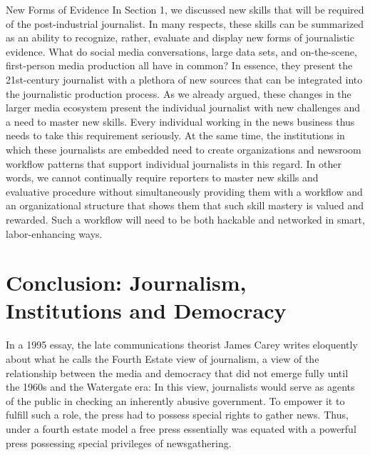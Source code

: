 New Forms of Evidence
In Section 1, we discussed new skills that will be required of the post-industrial
journalist. In many respects, these skills can be summarized as an ability to recognize,
rather, evaluate and display new forms of journalistic evidence. What do
social media conversations, large data sets, and on-the-scene, first-person media
production all have in common? In essence, they present the 21st-century journalist
with a plethora of new sources that can be integrated into the journalistic
production process.
As we already argued, these changes in the larger media ecosystem present the
individual journalist with new challenges and a need to master new skills. Every
individual working in the news business thus needs to take this requirement
seriously. At the same time, the institutions in which these journalists are embedded
need to create organizations and newsroom workflow patterns that support
individual journalists in this regard.
In other words, we cannot continually require reporters to master new skills and
evaluative procedure without simultaneously providing them with a workflow
and an organizational structure that shows them that such skill mastery is valued
and rewarded. Such a workflow will need to be both hackable and networked in
smart, labor-enhancing ways.
\chapter{Conclusion: Journalism, Institutions and Democracy}
In a 1995 essay, the late communications theorist James Carey writes eloquently
about what he calls the Fourth Estate view of journalism, a view of the relationship
between the media and democracy that did not emerge fully until the 1960s
and the Watergate era:
In this view, journalists would serve as agents of the public in checking
an inherently abusive government. To empower it to fulfill such a
role, the press had to possess special rights to gather news. Thus, under a
fourth estate model a free press essentially was equated with a powerful
press possessing special privileges of newsgathering.

